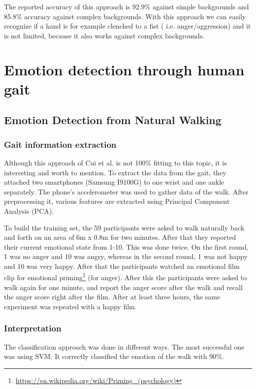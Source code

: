 \documentclass[conference]{IEEEtran}
\begin{document}
The reported accuracy of this approach is 92.9\% against simple backgrounds and 85.8\% accuracy against complex backgrounds.
With this approach we can easily recognize if a hand is for example clenched to a fist ( i.e. anger/aggression) and it is not  limited, because it also works against complex backgrounds.

\section{Emotion detection through human gait}
\label{sec:emotionGait}
\subsection{Emotion Detection from Natural Walking}
\label{subsec:EDNW}
\subsubsection{Gait information extraction}
Although this approach of Cui et al.\cite{cui2016emotion} is not 100\% fitting to this topic, it is interesting and worth to mention. To extract the data from the gait, they attached two smartphones (Samsung I9100G) to one wrist and one ankle separately\cite{cui2016emotion}.  The phone's accelerometer was used to gather data of the walk. After preprocessing it, various features are extracted using Principal Component Analysis (PCA).\

To build the training set, the 59 participants were asked to walk naturally back and forth on an area of 6m x 0.8m for two minutes\cite{cui2016emotion}. After that they reported their current emotional state from 1-10. This was done twice. On the first round, 1 was no anger and 10 was angry, whereas in the second round, 1 was not happy and 10 was very happy.  After that the participants watched an emotional film clip for emotional priming\footnote{\url{https://en.wikipedia.org/wiki/Priming_(psychology)}} (for anger). After this the participants were asked to walk again for one minute, and report the anger score after the walk and recall the anger score right after the film.  After at least three hours, the same experiment was repeated with a happy film. 
\subsubsection{Interpretation}
The classification approach was done in different ways. The most successful one was using SVM. It correctly classified the emotion of the walk with 90\%. 
\end{document}
